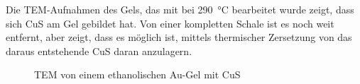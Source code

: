 	\begin{figure}[htbp]
	\centering
	\caption{}
	\label{fig:vn}
	\end{figure} 

	Die TEM-Aufnahmen des Gels, das mit  bei \SI{290}{\degreeCelsius} bearbeitet wurde zeigt, dass sich CuS am Gel gebildet hat.
	Von einer kompletten Schale ist es noch weit entfernt, aber zeigt, dass es möglich ist, mittels  thermischer Zersetzung von  das daraus entstehende CuS daran anzulagern.
	
	\begin{figure}[htbp]
		\centering
		\caption{TEM von einem ethanolischen Au-Gel mit CuS}
		\label{fig:E-Cu}
	\end{figure}

	
	   
	
 
 